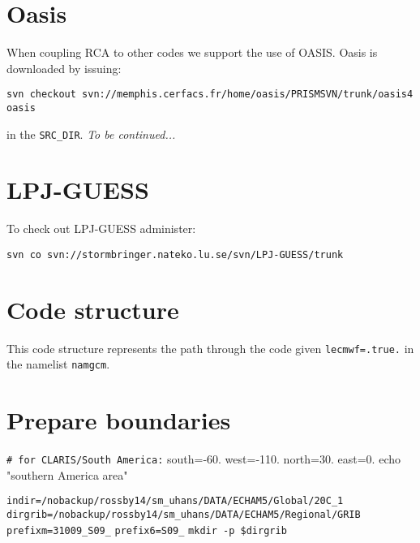 \documentclass{article}
\begin{document}
\section{Oasis}
When coupling RCA to other codes we support the use of OASIS.
Oasis is downloaded by issuing:
\begin{verbatim}
svn checkout svn://memphis.cerfacs.fr/home/oasis/PRISMSVN/trunk/oasis4 oasis
\end{verbatim}
in the \verb+SRC_DIR+. \emph{To be continued...}

\section{LPJ-GUESS}
To check out LPJ-GUESS administer:
\begin{verbatim}
svn co svn://stormbringer.nateko.lu.se/svn/LPJ-GUESS/trunk
\end{verbatim}


\appendix
\newpage
\section{Code structure}

This code structure represents the path through the code given \verb+lecmwf=.true.+ in the namelist \verb+namgcm+.


\newpage
\section{Prepare boundaries }
\label{app:Prepareboundaries}

\verb+# for CLARIS/South America:+
\newline
south=-60.
\newline
west=-110.
\newline
north=30.
\newline
east=0.
\newline
echo "southern America area"

\verb+indir=/nobackup/rossby14/sm_uhans/DATA/ECHAM5/Global/20C_1+
\newline
\verb+dirgrib=/nobackup/rossby14/sm_uhans/DATA/ECHAM5/Regional/GRIB+
\newline
\verb+prefixm=31009_S09_+
\newline
\verb+prefix6=S09_+
\newline
\verb+mkdir -p $dirgrib+
\end{document}
